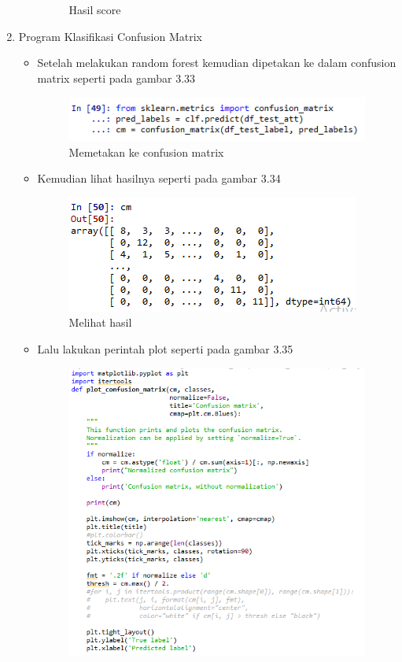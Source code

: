 \begin{enumerate}
\begin{itemize}
\begin{figure}[ht]
			\caption{Hasil score}
			\end{figure}
	\end{itemize}
\item Program Klasifikasi Confusion Matrix
	\begin{itemize}
		\item Setelah melakukan random forest kemudian dipetakan ke dalam confusion matrix seperti pada gambar 3.33
			\begin{figure}[ht]
			\centering
			\includegraphics[scale=0.7]{figures/PRF/5_1.png}
			\caption{Memetakan ke confusion matrix}
			\end{figure}
		\item Kemudian lihat hasilnya seperti pada gambar 3.34
			\begin{figure}[ht]
			\centering
			\includegraphics[scale=0.7]{figures/PRF/5_2.png}
			\caption{Melihat hasil}
			\end{figure}
		\item Lalu lakukan perintah plot seperti pada gambar 3.35
			\begin{figure}[ht]
			\centering
			\includegraphics[scale=0.7]{figures/PRF/5_3.png}

\end{figure}
\end{itemize}
\end{enumerate}
